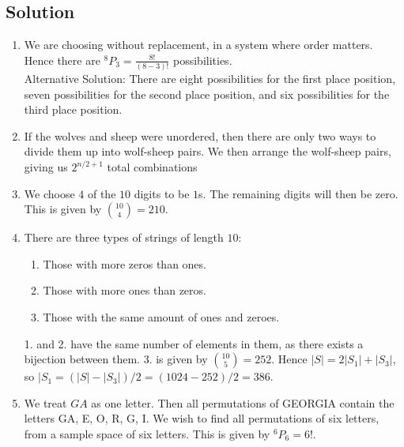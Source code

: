 \documentclass{article}
\begin{document}
\subsection*{Solution}
    \begin{enumerate}
        \item We are choosing without replacement, in a system where order matters. Hence there are ${}^8P_{3} = \frac{8!}{(8 - 3)!}$ possibilities. \\
        Alternative Solution: There are eight possibilities for the first place position, seven possibilities for the second place position, and six possibilities for the third place position.
        \item If the wolves and sheep were unordered, then there are only two ways to divide them up into wolf-sheep pairs. We then arrange the wolf-sheep pairs, giving us $2^{n/2 + 1}$ total combinations
        \item We choose $4$ of the $10$ digits to be $1$s. The remaining digits will then be zero. This is given by $\binom{10}{4} = 210$.
        \item There are three types of strings of length $10$:
        \begin{enumerate}[label = \arabic*.]
            \item Those with more zeros than ones.
            \item Those with more ones than zeros.
            \item Those with the same amount of ones and zeroes.
        \end{enumerate}
        1. and 2. have the same number of elements in them, as there exists a bijection between them. 3. is given by $\binom{10}{5} = 252$. Hence $|S| = 2|S_{1}| + |S_{3}|$, so $|S_{1} = (|S| - |S_{3}|)/2 = (1024 - 252)/2 = 386$.
        \item We treat $GA$ as one letter. Then all permutations of GEORGIA contain the letters GA, E, O, R, G, I. We wish to find all permutations of six letters, from a sample space of six letters. This is given by ${}^6P_{6} = 6!$.
    \end{enumerate}
\end{document}
